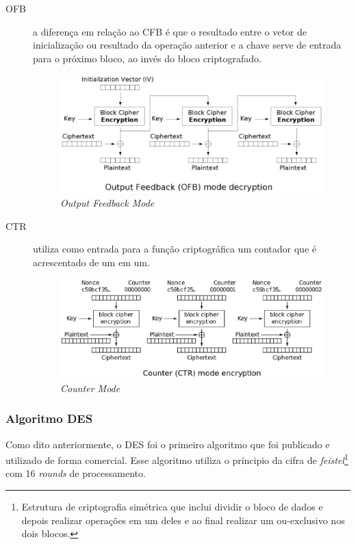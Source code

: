 \begin{description}
\item[OFB] a diferença em relação ao CFB é que o resultado entre o vetor de inicialização ou resultado da operação anterior e a chave serve de entrada para o próximo bloco, ao invés do bloco criptografado.
\begin{figure}[h]
\centering
\includegraphics[keepaspectratio=true,scale=0.7]
    {figuras/ofb.eps}
    \caption[Output Feedback Mode]{\textit{Output Feedback Mode}\protect\footnotemark} 
\end{figure}
\item[CTR] utiliza como entrada para a função criptográfica um contador que é acrescentado de um em um. 
\begin{figure}[h]
\centering
\includegraphics[keepaspectratio=true,scale=0.5]
    {figuras/ctr.eps}
    \caption[Counter Mode]{\textit{Counter Mode}\protect\footnotemark} 
\end{figure}
\end{description}

\subsubsection{Algoritmo DES}

Como dito anteriormente, o DES foi o primeiro algoritmo que foi publicado e utilizado de forma comercial. Esse algoritmo utiliza o príncipio da cifra de \textit{feistel}\footnote{Estrutura de criptografia simétrica que inclui dividir o bloco de dados e depois realizar operações em um deles e ao final realizar um ou-exclusivo nos dois blocos.} com 16 \textit{rounds} de processamento.

